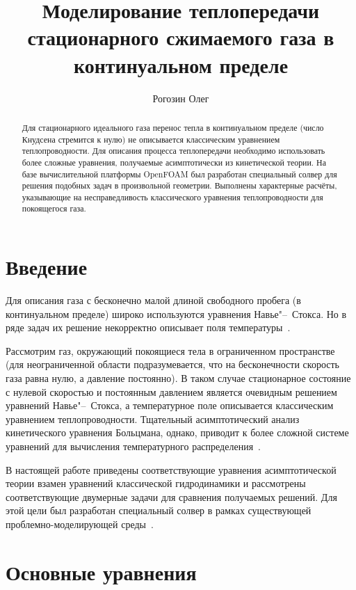 \documentclass[english,russian,a4paper,10pt]{article}
\title{Моделирование теплопередачи стационарного сжимаемого газа в континуальном пределе}
\author{Рогозин Олег}
\date{}
\begin{document}
\maketitle
\begin{abstract}
	Для стационарного идеального газа перенос тепла в континуальном пределе (число Кнудсена стремится к нулю)
	не описывается классическим уравнением теплопроводности. Для описания процесса теплопередачи необходимо
	использовать более сложные уравнения, получаемые асимптотически из кинетической теории.
	На базе вычислительной платформы OpenFOAM\textregistered{} был разработан специальный солвер
	для решения подобных задач в произвольной геометрии.
	Выполнены характерные расчёты, указывающие на несправедливость классического уравнения теплопроводности
	для покоящегося газа.
\end{abstract}

\section{Введение}

Для описания газа с бесконечно малой длиной свободного пробега (в континуальном пределе)
широко используются уравнения Навье"--~Стокса.
Но в ряде задач их решение некорректно описывает поля температуры~\cite{Kogan1976,Bobylev1996}.

Рассмотрим газ, окружающий покоящиеся тела в ограниченном пространстве
(для неограниченной области подразумевается, что на бесконечности скорость газа равна нулю, а давление постоянно).
В таком случае стационарное состояние с нулевой скоростью и постоянным давлением является
очевидным решением уравнений Навье"--~Стокса, а температурное поле описывается
классическим уравнением теплопроводности.
Тщательный асимптотический анализ кинетического уравнения Больцмана, однако, приводит
к более сложной системе уравнений для вычисления температурного распределения~\cite{Bobylev1996}.

В настоящей работе приведены соответствующие уравнения асимптотической теории взамен
уравнений классической гидродинамики и рассмотрены соответствующие двумерные задачи для сравнения
получаемых решений. Для этой цели был разработан специальный солвер в рамках существующей
проблемно-моделирующей среды~\cite{Rogozin2011, Martynov2011}.

\section{Основные уравнения}
\end{document}
